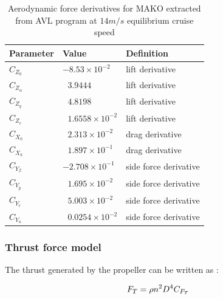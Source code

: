 \begin{table}
\caption{Aerodynamic force derivatives for MAKO extracted from AVL program at $14 m/s$ equilibrium cruise speed\cite{bronz2016aerodynamic}}
\label{arm:forcesMAKO}
\begin{center}
\begin{tabular}{ ||p{3cm}|p{3cm}|p{4cm}||}\hline
\textbf{Parameter} & \textbf{Value} & \textbf{Definition} \\\hline
$C_{Z_0}$                             & $-8.53 \times 10^{-2}$	         & lift derivative \\\hline
$C_{Z_{\alpha}}$                   & $\ \ \,3.9444$                               & lift derivative \\\hline
$C_{Z_q}$                             & $\ \ \,4.8198$	       		         & lift derivative \\\hline
$C_{Z_e}$                             & $\ \ \,1.6558 \times 10^{-2}$        & lift derivative \\\hline
$C_{X_0}$                             & $\ \ \, 2.313 \times 10^{-2}$	   & drag derivative \\\hline
$C_{X_k}$                              & $\ \ \, 1.897 \times 10^{-1}$          & drag derivative \\\hline
$C_{Y_\beta}$ 			     & $-2.708 \times 10^{-1}$             & side force derivative \\\hline
$C_{Y_{\tilde{p}}}$                 & $\ \ \, 1.695 \times 10^{-2}$	& side force derivative \\\hline
$C_{Y_{\tilde{r}}}$                  & $\ \ \, 5.003 \times 10^{-2}$ 	& side force derivative \\\hline
$C_{Y_a}$                             & $\ \ \, 0.0254 \times 10^{-2}$	& side force derivative \\\hline
\end{tabular}
\end{center}
\end{table}


\subsubsection{Thrust force model}

The thrust generated by the propeller can be written as :

\begin{equation}{\label{eqn:thrustModel}}
F_T = \rho n^2 D^4 C_{F_T}
\end{equation}

